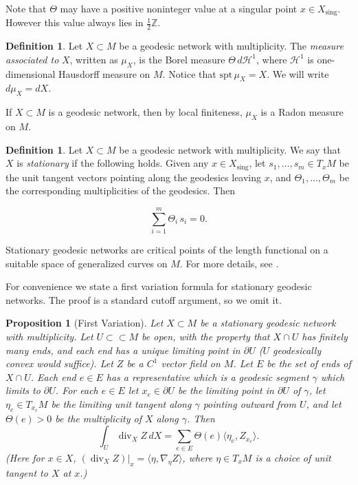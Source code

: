 \documentclass[11pt,reqno,twoside]{amsart}
\newcommand{\on}{\operatorname}
\newcommand{\divv}{\on{div}}
\newcommand{\spt}{\mathrm{spt}}
\newcommand{\sing}{\mathrm{sing}}
\newcommand{\dee}{\partial}
\newtheorem{proposition}[lemma]{Proposition}
\theoremstyle{definition}
\newtheorem{definition}[lemma]{Definition}
\begin{document}
Note that $\Theta$ may have a positive noninteger value at a singular point $x \in X_\sing$. However this value always lies in $\frac{1}{2}\mathbb{Z}$.

\begin{definition}
    Let $X \subset M$ be a geodesic network with multiplicity. The \emph{measure associated to} $X$, written as $\mu_X$, is the Borel measure $\Theta \, d\mathcal{H}^1$, where $\mathcal{H}^1$ is one-dimensional Hausdorff measure on $M$. Notice that $\spt \,\mu_X = X$. We will write $d\mu_X = dX.$
\end{definition}

If $X \subset M$ is a geodesic network, then by local finiteness, $\mu_X$ is a Radon measure on $M$.

\begin{definition}
    Let $X \subset M$ be a geodesic network with multiplicity. We say that $X$ is \emph{stationary} if the following holds. Given any $x \in X_\sing$, let $s_1,\ldots,s_m \in T_xM$ be the unit tangent vectors pointing along the geodesics leaving $x$, and $\Theta_1,\ldots,\Theta_m$ be the corresponding multiplicities of the geodesics. Then 

    \[\sum_{i=1}^m \Theta_i \, s_i = 0.\]
\end{definition}

Stationary geodesic networks are critical points of the length functional on a suitable space of generalized curves on $M$. For more details, see \cite{Allard1976}.

For convenience we state a first variation formula for stationary geodesic networks. The proof is a standard cutoff argument, so we omit it. 

\begin{proposition}[First Variation] \label{first-variation}
Let $X \subset M$ be a stationary geodesic network with multiplicity. Let $U \subset\subset M$ be open, with the property that $X \cap U$ has finitely many ends, and each end has a unique limiting point in $\partial U$ ($U$ geodesically convex would suffice).
Let $Z$ be a $C^1$ vector field on $M$. Let $E$ be the set of ends of $X \cap U$. Each end $e \in E$ has a representative which is a geodesic segment $\gamma$ which limits to $\dee U$. For each $e \in E$ let $x_e \in \partial U$ be the limiting point in $\partial U$ of $\gamma$, let $\eta_e \in T_{x_e}M$ be the limiting unit tangent along $\gamma$ pointing outward from $U$, and let $\Theta(e) > 0$ be the multiplicity of $X$ along $\gamma$. Then
\[\int_U \divv_X Z \, dX = \sum_{e \in E} \Theta(e) \langle \eta_e, Z_{x_e}\rangle.\]
(Here for $x \in X$, $(\divv_X Z)|_x = \langle\eta, \nabla_\eta Z\rangle$, where $\eta \in T_xM$ is a choice of unit tangent to $X$ at $x$.)

\end{proposition}
\end{document}
